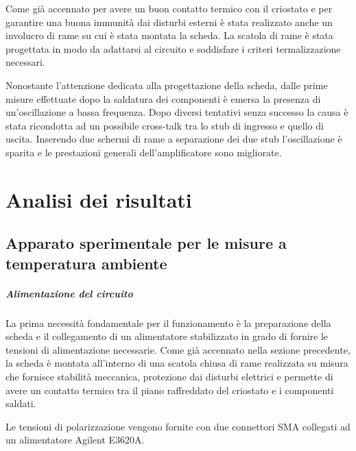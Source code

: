 \documentclass[12pt,oneside]{book}
\begin{document}
Come già accennato per avere un buon contatto termico con il criostato e per garantire una buona immunità dai disturbi esterni è stata realizzato anche un involucro di rame su cui è stata montata la scheda. La scatola di rame è stata progettata in modo da adattarsi al circuito e soddisfare i criteri termalizzazione necessari.

Nonostante l'attenzione dedicata alla progettazione della scheda, dalle prime misure effettuate dopo la saldatura dei componenti è emersa la presenza di un'oscillazione a bassa frequenza. Dopo diversi tentativi senza successo la causa è stata ricondotta ad un possibile cross-talk tra lo stub di ingresso e quello di uscita. Inserendo due schermi di rame a separazione dei due stub l'oscillazione è sparita e le prestazioni generali dell'amplificatore sono migliorate.

\chapter{Analisi dei risultati}
\label{sect_results}

\section{Apparato sperimentale per le misure a temperatura ambiente}
\paragraph{Alimentazione del circuito}
La prima necessità fondamentale per il funzionamento è la preparazione della scheda e il collegamento di un alimentatore stabilizzato in grado di fornire le tensioni di alimentazione necessarie.
Come già accennato nella sezione precedente, la scheda è montata all'interno di una scatola chiusa di rame realizzata su misura che fornisce stabilità meccanica, protezione dai disturbi elettrici e permette di avere un contatto termico tra il piano raffreddato del criostato e i componenti saldati.

Le tensioni di polarizzazione vengono fornite con due connettori SMA collegati ad un alimentatore Agilent E3620A.
\end{document}
